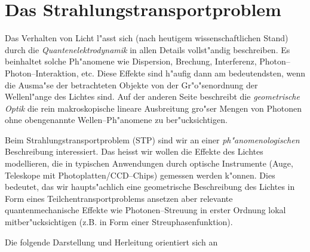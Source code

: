	\section{Das Strahlungstransportproblem}
	\label{sec:radiative_transfer}
	
	Das Verhalten von Licht l"asst sich (nach heutigem wissenschaftlichen Stand) durch die {\em Quantenelektrodynamik} in allen Details vollst"andig beschreiben. Es beinhaltet solche Ph"anomene wie Dispersion, Brechung, Interferenz, Photon--Photon--Interaktion, etc. Diese Effekte sind h"aufig dann am bedeutendsten, wenn die Ausma"se der betrachteten Objekte von der Gr"o"senordnung der Wellenl"ange des Lichtes sind. Auf der anderen Seite beschreibt die {\em geometrische Optik} die rein makroskopische lineare Ausbreitung gro"ser Mengen von Photonen ohne obengenannte Wellen--Ph"anomene zu ber"ucksichtigen.
	
	Beim Strahlungstransportproblem (STP) sind wir an einer {\em ph"anomenologischen} Beschreibung interessiert. Das heisst wir wollen die Effekte des Lichtes modellieren, die in typischen Anwendungen durch optische Instrumente (Auge, Teleskope mit Photoplatten/CCD--Chips) gemessen werden k"onnen. Dies bedeutet, das wir haupts"achlich eine geometrische Beschreibung des Lichtes in Form eines Teilchentransportproblems ansetzen aber relevante quantenmechanische Effekte wie Photonen--Streuung in erster Ordnung lokal mitber"ucksichtigen (z.B. in Form einer Streuphasenfunktion).
	
	Die folgende Darstellung und Herleitung orientiert sich an \citep{Arvo:1993p9035}
	
